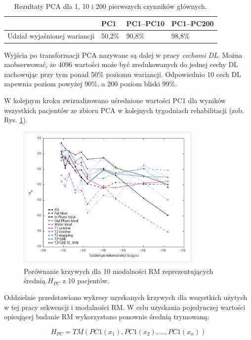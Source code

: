 \renewcommand{\arraystretch}{1.2}
\begin{table}[h!]
 \setlength{\tabcolsep}{12pt}
 \centering
 \caption{Rezultaty PCA dla 1, 10 i 200 pierwszych czynników głównych.}
 \label{PCA-results}
 \begin{tabular}{l|l|l|l}
 
 & PC1 & PC1--PC10 & PC1--PC200 \\ \hline \hline
 Udział wyjaśnionej wariancji & 50,2\% & 90,8\%   & 98,8\% \\ \hline 
 \end{tabular}
 \end{table}
\renewcommand{\arraystretch}{1}
Wyjścia po transformacji PCA nazywane są dalej w pracy \textit{cechami DL}. Można zaobserwować, że 4096 wartości może być zredukowanych do jednej cechy DL zachowując przy tym ponad 50\% poziomu wariancji. Odpowiednio 10 cech DL zapewnia poziom powyżej 90\%, a 200 poziom bliski 99\%. 

W kolejnym kroku zwizualizowano uśrednione wartości PC1 dla wyników wszystkich pacjentów ze zbioru PCA w kolejnych tygodniach rehabilitacji (zob. Rys. \ref{fig:H}).

\begin{figure}[h!]
	\centering
	\includegraphics[width=0.8\textwidth]{figures/H_PC1.jpg}
	\caption{Porównanie krzywych dla 10 modalności RM reprezentujących średnią $H_{PC}$ z 10 pacjentów.}\label{fig:H}
\end{figure}
Oddzielnie przedstawiono wykresy uzyskanych krzywych dla wszystkich użytych w tej pracy sekwencji i modalności RM. W celu uzyskania pojedynczej wartości opisującej badanie RM wykorzystano ponownie średnią trymowaną:

\begin{equation}
\label{ecq:HPC}
H_{PC} = TM(PC1(x_1), PC1(x_2),..., PC1(x_n))
\end{equation}

